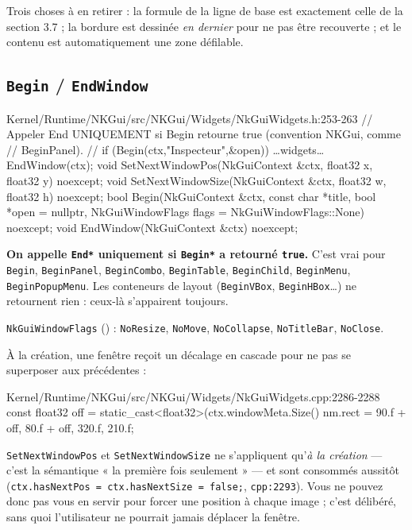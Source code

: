Trois choses à en retirer : la formule de la ligne de base est exactement celle
de la section 3.7 ; la bordure est dessinée \emph{en dernier} pour ne pas être
recouverte ; et le contenu est automatiquement une zone défilable.

\subsection{\texttt{Begin} / \texttt{EndWindow}}

\begin{nkcode}{Kernel/Runtime/NKGui/src/NKGui/Widgets/NkGuiWidgets.h:253-263}
// Appeler End UNIQUEMENT si Begin retourne true (convention NKGui, comme
// BeginPanel).
//   if (Begin(ctx,"Inspecteur",&open)) { …widgets… EndWindow(ctx); }
void SetNextWindowPos(NkGuiContext &ctx, float32 x, float32 y) noexcept;
void SetNextWindowSize(NkGuiContext &ctx, float32 w, float32 h) noexcept;
bool Begin(NkGuiContext &ctx, const char *title, bool *open = nullptr,
           NkGuiWindowFlags flags = NkGuiWindowFlags::None) noexcept;
void EndWindow(NkGuiContext &ctx) noexcept;
\end{nkcode}

\begin{nkretenir}
\textbf{On appelle \texttt{End*} uniquement si \texttt{Begin*} a retourné
\texttt{true}.} C'est vrai pour \texttt{Begin}, \texttt{BeginPanel},
\texttt{BeginCombo}, \texttt{BeginTable}, \texttt{BeginChild},
\texttt{BeginMenu}, \texttt{BeginPopupMenu}. Les conteneurs de layout
(\texttt{BeginVBox}, \texttt{BeginHBox}\dots) ne retournent rien : ceux-là
s'appairent toujours.
\end{nkretenir}

\texttt{NkGuiWindowFlags} () : \texttt{NoResize},
\texttt{NoMove}, \texttt{NoCollapse}, \texttt{NoTitleBar}, \texttt{NoClose}.

À la création, une fenêtre reçoit un décalage en cascade pour ne pas se
superposer aux précédentes :

\begin{nkcode}{Kernel/Runtime/NKGui/src/NKGui/Widgets/NkGuiWidgets.cpp:2286-2288}
const float32 off = static_cast<float32>(ctx.windowMeta.Size() %
nm.rect = {90.f + off, 80.f + off, 320.f, 210.f};
\end{nkcode}

\texttt{SetNextWindowPos} et \texttt{SetNextWindowSize} ne s'appliquent qu'\emph{à
la création} — c'est la sémantique « la première fois seulement » — et sont
consommés aussitôt (\texttt{ctx.hasNextPos = ctx.hasNextSize = false;},
\texttt{cpp:2293}). Vous ne pouvez donc pas vous en servir pour forcer une
position à chaque image ; c'est délibéré, sans quoi l'utilisateur ne pourrait
jamais déplacer la fenêtre.

